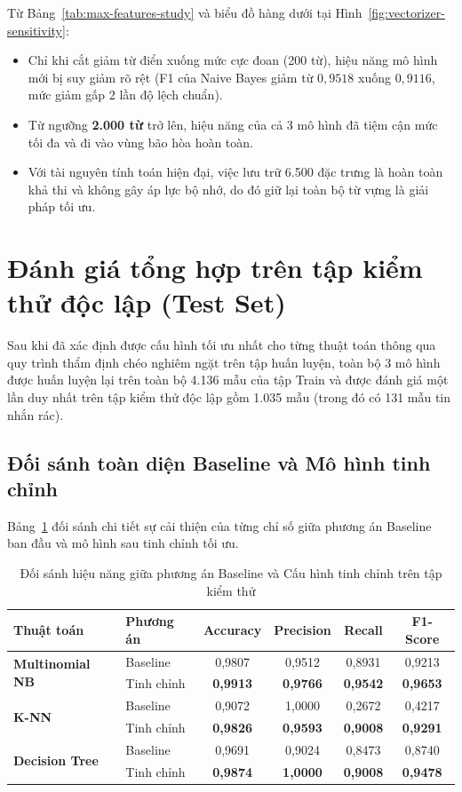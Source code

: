Từ Bảng~\ref{tab:max-features-study} và biểu đồ hàng dưới tại Hình~\ref{fig:vectorizer-sensitivity}:
\begin{itemize}
    \item Chỉ khi cắt giảm từ điển xuống mức cực đoan (200 từ), hiệu năng mô hình mới bị suy giảm rõ rệt (F1 của Naive Bayes giảm từ $0,9518$ xuống $0,9116$, mức giảm gấp 2 lần độ lệch chuẩn).
    \item Từ ngưỡng \textbf{2.000 từ} trở lên, hiệu năng của cả 3 mô hình đã tiệm cận mức tối đa và đi vào vùng bão hòa hoàn toàn.
    \item Với tài nguyên tính toán hiện đại, việc lưu trữ 6.500 đặc trưng là hoàn toàn khả thi và không gây áp lực bộ nhớ, do đó giữ lại toàn bộ từ vựng là giải pháp tối ưu.
\end{itemize}

\section{Đánh giá tổng hợp trên tập kiểm thử độc lập (Test Set)}
\label{sec:danh-gia-test}

Sau khi đã xác định được cấu hình tối ưu nhất cho từng thuật toán thông qua quy trình thẩm định chéo nghiêm ngặt trên tập huấn luyện, toàn bộ 3 mô hình được huấn luyện lại trên toàn bộ 4.136 mẫu của tập Train và được đánh giá một lần duy nhất trên tập kiểm thử độc lập gồm 1.035 mẫu (trong đó có 131 mẫu tin nhắn rác).

\subsection{Đối sánh toàn diện Baseline và Mô hình tinh chỉnh}
Bảng~\ref{tab:baseline-vs-tuned} đối sánh chi tiết sự cải thiện của từng chỉ số giữa phương án Baseline ban đầu và mô hình sau tinh chỉnh tối ưu.

\begin{table}[H]
\centering
\caption{Đối sánh hiệu năng giữa phương án Baseline và Cấu hình tinh chỉnh trên tập kiểm thử}
\label{tab:baseline-vs-tuned}
\begin{tabular}{|l|l|c|c|c|c|}
\hline
\textbf{Thuật toán} & \textbf{Phương án} & \textbf{Accuracy} & \textbf{Precision} & \textbf{Recall} & \textbf{F1-Score} \\
\hline
\multirow{2}{*}{\textbf{Multinomial NB}} & Baseline & 0,9807 & 0,9512 & 0,8931 & 0,9213 \\
\cline{2-6}
& Tinh chỉnh & \textbf{0,9913} & \textbf{0,9766} & \textbf{0,9542} & \textbf{0,9653} \\
\hline
\multirow{2}{*}{\textbf{K-NN}} & Baseline & 0,9072 & 1,0000 & 0,2672 & 0,4217 \\
\cline{2-6}
& Tinh chỉnh & \textbf{0,9826} & \textbf{0,9593} & \textbf{0,9008} & \textbf{0,9291} \\
\hline
\multirow{2}{*}{\textbf{Decision Tree}} & Baseline & 0,9691 & 0,9024 & 0,8473 & 0,8740 \\
\cline{2-6}
& Tinh chỉnh & \textbf{0,9874} & \textbf{1,0000} & \textbf{0,9008} & \textbf{0,9478} \\
\hline
\end{tabular}
\end{table}

